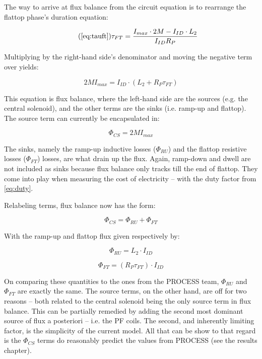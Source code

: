 The way to arrive at flux balance from the circuit equation is to rearrange the flattop phase's duration equation:

\begin{equation}
	\tag{\ref{eq:tauft}}
	\tau_{FT} = \frac{ I_{max} \cdot 2 M - I_{ID} \cdot  L_2 }{I_{ID} R_P}
\end{equation}

Multiplying by the right-hand side's denominator and moving the negative term over yields:

\begin{equation}
	2 M I_{max} = I_{ID} \cdot \left( L_2 + R_P \tau_{FT} \right) 
\end{equation}

This equation is flux balance, where the left-hand side are the sources (e.g. the central solenoid), and the other terms are the sinks (i.e. ramp-up and flattop). The source term can currently be encapsulated in:

\begin{equation}
	\Phi_{CS} = 2 M I_{max}
\end{equation}

The sinks, namely the ramp-up inductive losses ($\Phi_{RU}$) and the flattop resistive losses ($\Phi_{FT}$) losses, are what drain up the flux. Again, ramp-down and dwell are not included as sinks because flux balance only tracks till the end of flattop. They come into play when measuring the cost of electricity -- with the duty factor from \cref{eq:duty}.

Relabeling terms, flux balance now has the form:

\begin{equation}
	\Phi_{CS} = \Phi_{RU} + \Phi_{FT}
\end{equation}

With the ramp-up and flattop flux given respectively by:

\begin{equation}
	\Phi_{RU} = L_2 \cdot I_{ID}
\end{equation}

\begin{equation}
	\Phi_{FT} = ( R_P \tau_{FT} ) \cdot I_{ID}
\end{equation}

On comparing these quantities to the ones from the PROCESS team, $\Phi_{RU}$ and $\Phi_{FT}$ are exactly the same. The source terms, on the other hand, are off for two reasons -- both related to the central solenoid being the only source term in flux balance. This can be partially remedied by adding the second most dominant source of flux a posteriori -- i.e. the PF coils. The second, and inherently limiting factor, is the simplicity of the current model. All that can be show to that regard is the $\Phi_{CS}$ terms do reasonably predict the values from PROCESS (see the results chapter).

